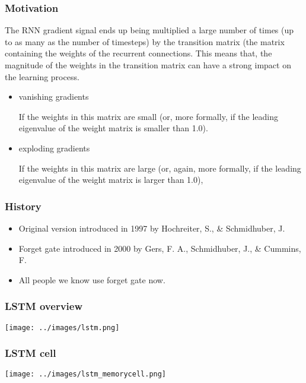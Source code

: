 \documentclass[utf8x,xcolor=pdftex,dvipsnames,table]{beamer}
\begin{document}
\begin{frame}
  \frametitle{Motivation}

The RNN gradient signal ends up being multiplied a large number of
times (up to as many as the number of timesteps) by the transition
matrix (the matrix containing the weights of the recurrent
connections.  This means that, the magnitude of the weights in the
transition matrix can have a strong impact on the learning process.

\begin{itemize}
\item \begin{bf}vanishing gradients\end{bf}
 If the weights in this matrix are small (or, more formally, if the leading eigenvalue of the weight matrix is smaller than 1.0).
\item \begin{bf}exploding gradients\end{bf} If the weights in this matrix are large (or, again, more formally, if the leading eigenvalue of the weight matrix is larger than 1.0),
\end{itemize}
\end{frame}

\begin{frame}
  \frametitle{History}
\begin{itemize}
\item Original version introduced in 1997 by Hochreiter, S., \& Schmidhuber, J.
\item Forget gate introduced in 2000 by Gers, F. A., Schmidhuber, J., \& Cummins, F.
\item All people we know use forget gate now.
\end{itemize}
\end{frame}

\begin{frame}
  \frametitle{LSTM overview}
\texttt{[image: ../images/lstm.png]}
\end{frame}


\begin{frame}
  \frametitle{LSTM cell}
\texttt{[image: ../images/lstm\_memorycell.png]}
\end{frame}
\end{document}
